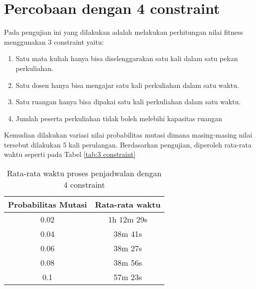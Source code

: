 \section{Percobaan dengan 4 constraint}
\label{sec:pengujian 4}
Pada pengujian ini yang dilakukan adalah melakukan perhitungan nilai fitness menggunakan 3 constraint yaitu:
\begin{enumerate}[nolistsep]
  \item Satu mata kuliah hanya bisa diselenggarakan satu kali dalam satu pekan perkuliahan.
  \item Satu dosen hanya bisa mengajar satu kali perkuliahan dalam satu waktu.
  \item Satu ruangan hanya bisa dipakai satu kali perkuliahan dalam satu waktu.
  \item Jumlah peserta perkuliahan tidak boleh melebihi kapasitas ruangan
\end{enumerate} 
Kemudian dilakukan variasi nilai probabilitas mutasi dimana masing-masing nilai tersebut dilakukan 5 kali perulangan. 
Berdasarkan pengujian, diperoleh rata-rata waktu seperti pada Tabel \ref{tab:3 constraint}

\begin{longtable}[c]{|c|c|}
  \caption{Rata-rata waktu proses penjadwalan dengan 4 constraint}
  \label{tab:4 constaint}\\
  \hline
  \rowcolor[HTML]{C0C0C0} 
  Probabilitas Mutasi & Rata-rata waktu \\ \hline
  \endfirsthead
  \endhead
  0.02                & 1h 12m 29s      \\ \hline
  0.04                & 38m 41s         \\ \hline
  0.06                & 38m 27s         \\ \hline
  0.08                & 38m 56s         \\ \hline
  0.1                 & 57m 23s         \\ \hline
  \end{longtable}

